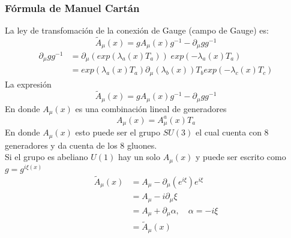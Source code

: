 \documentclass[../main.tex]{subfiles}
\begin{document}
\subsubsection{Fórmula de Manuel Cartán}
La ley de transfomación de la conexión de Gauge (campo de Gauge) es:
\begin{equation}
  \tilde{{A}}_\mu(x) = gA_\mu(x) g^{-1} - \partial_\mu g g^{-1}
\end{equation}
\begin{align*}
  \partial_\mu g g^{-1} & = \partial_\mu \left( exp(\lambda_a(x)T_a) \right)\; exp(-\lambda_a(x)T_a) \\
  & = exp (\lambda_a(x)T_a) \partial_\mu (\lambda_b(x))T_b exp(-\lambda_c(x)T_c)
\end{align*}
La expresión
\begin{equation}
  \tilde{{A}}_\mu(x) = gA_\mu(x)g^{-1} - \partial_\mu gg^{-1}
 \end{equation}
 En donde $A_\mu(x)$ es una combinación lineal de generadores
 \begin{equation}
   A_\mu(x) = A^a_\mu(x)T_a 
  \end{equation}
  En donde  $A_\mu(x)$  esto puede ser el grupo $SU(3)$ el cual cuenta con 8 generadores y da cuenta de los 8 gluones. \\
  Si el grupo es abeliano $U(1)$ hay un solo $A_\mu(x)$ y puede ser escrito como $g=g^{i\xi(x)}$
  \begin{align*}
    \tilde{{A}}_\mu(x) & = A_\mu - \partial_\mu (e^{i\xi}) e^{i\xi} \\
    & = A_\mu - i\partial_\mu \xi \\
    & = A_\mu + \partial_\mu \alpha,\quad \alpha=-i\xi \\
    & = \tilde{{A}}_\mu (x) 
  \end{align*}
\end{document}
